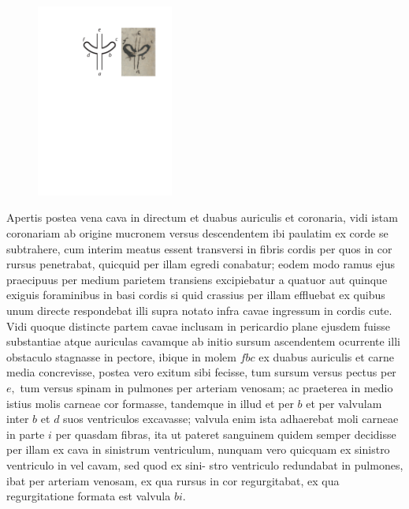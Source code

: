 \pend%
\pstart%
\begin{figure}
\includegraphics[trim = 0mm -3mm -5mm 0mm, clip, width=0.4\textwidth]{images/lh0040104b_005r.pdf}\\
\end{figure}%
Apertis postea vena cava in directum et duabus auriculis et coronaria, vidi istam coronariam ab origine mucronem versus descendentem ibi paulatim ex corde se subtrahere, cum interim meatus essent transversi in fibris cordis per quos in cor rursus penetrabat, quicquid per illam egredi conabatur; eodem modo ramus ejus praecipuus per medium parietem transiens excipiebatur a quatuor aut quinque exiguis foraminibus in basi cordis si quid crassius per illam effluebat ex quibus unum directe respondebat illi supra notato infra cavae ingressum in cordis cute. Vidi quoque distincte partem cavae inclusam in pericardio plane ejusdem fuisse substantiae atque auriculas cavamque ab initio sursum ascendentem ocurrente illi obstaculo stagnasse in pectore,
ibique in molem $fbc$ ex duabus auriculis et carne media concrevisse, postea vero exitum sibi fecisse, tum sursum versus pectus per $e,$ tum versus spinam in pulmones per
arteriam venosam; ac praeterea in medio istius molis carneae cor formasse, tandemque in illud et per $b$ et per valvulam inter $b$ et $d$ suos ventriculos excavasse; valvula enim ista adhaerebat moli carneae in parte $i$ per quasdam fibras, ita ut pateret sanguinem quidem semper decidisse per illam ex cava in sinistrum ventriculum, nunquam vero quicquam ex sinistro ventriculo in
vel cavam, sed quod ex sini-
\pend
\newpage
\pstart\noindent stro ventriculo redundabat in pulmones, ibat per arteriam venosam, ex qua rursus in cor regurgitabat, ex qua regurgitatione formata est valvula $bi.$
